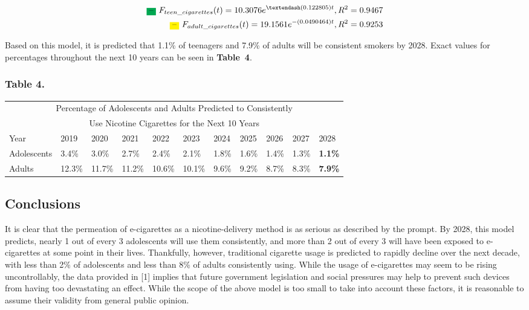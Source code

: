\begin{align}
    \text{\colorbox{Green}{--} } F_{teen\_cigarettes}(t) = 10.3076e^{–(0.122805)t}, R^2 = 0.9467 \\
    \text{\colorbox{Yellow}{--} } F_{adult\_cigarettes}(t) = 19.1561e^{-(0.0490464)t}, R^2 = 0.9253
\end{align}

Based on this model, it is predicted that 1.1\% of teenagers and 7.9\% of adults will be consistent smokers by 2028. Exact values for percentages throughout the next 10 years can be seen in \textbf{Table~4}.

\subsubsection*{Table 4.}
\begin{center}
    \begin{tabular}{p{1in} p{0.4in} p{0.4in} p{0.4in} p{0.4in} p{0.4in} p{0.4in} p{0.4in} p{0.4in} p{0.4in} p{0.4in}}
        \toprule
        \multicolumn{11}{c}{Percentage of Adolescents and Adults Predicted to Consistently}\\
        \multicolumn{11}{c}{Use Nicotine Cigarettes for the Next 10 Years}\\    
        \midrule
        Year & 2019 & 2020 & 2021 & 2022 & 2023 & 2024 & 2025 & 2026 & 2027 & 2028 \\
        \midrule
        Adolescents & 3.4\% & 3.0\% & 2.7\% & 2.4\% & 2.1\% & 1.8\% & 1.6\% & 1.4\% & 1.3\% & \textbf{1.1\%} \\
        Adults & 12.3\% & 11.7\% & 11.2\% & 10.6\% & 10.1\% & 9.6\% & 9.2\% & 8.7\% & 8.3\% & \textbf{7.9\%} \\
        \bottomrule
    \end{tabular}
\end{center}

\subsection{Conclusions}

It is clear that the permeation of e-cigarettes as a nicotine-delivery method is as serious as described by the prompt. By 2028, this model predicts, nearly 1 out of every 3 adolescents will use them consistently, and more than 2 out of every 3 will have been exposed to e-cigarettes at some point in their lives. Thankfully, however, traditional cigarette usage is predicted to rapidly decline over the next decade, with less than 2\% of adolescents and less than 8\% of adults consistently using. While the usage of e-cigarettes may seem to be rising uncontrollably, the data provided in [1] implies that future government legislation and social pressures may help to prevent such devices from having too devastating an effect. While the scope of the above model is too small to take into account these factors, it is reasonable to assume their validity from general public opinion. 

